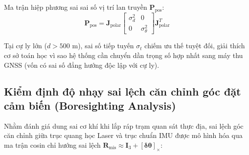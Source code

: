 Ma trận hiệp phương sai sai số vị trí lan truyền $\mathbf{P}_{\text{pos}}$:
\begin{equation}
\mathbf{P}_{\text{pos}} = \mathbf{J}_{\text{polar}} \begin{bmatrix} \sigma_d^2 & 0 \\ 0 & \sigma_\theta^2 \end{bmatrix} \mathbf{J}_{\text{polar}}^T
\label{eq:polar-covariance-propagation}
\end{equation}

\begin{table}[H]
\centering
\caption{Kích thước bán trục lớn elip sai số $3\sigma$ theo cự ly quan sát ($\sigma_d = 0{,}1$ m, $\sigma_\theta = 0{,}1^\circ$)}
\label{tab:range-error-ellipse-table}
\end{table}

Tại cự ly lớn ($d > 500$ m), sai số tiếp tuyến $\sigma_t$ chiếm ưu thế tuyệt đối, giải thích cơ sở toán học vì sao hệ thống cần chuyển dần trọng số hợp nhất sang máy thu GNSS (vốn có sai số đẳng hướng độc lập với cự ly).

\subsection{Kiểm định độ nhạy sai lệch căn chỉnh góc đặt cảm biến (Boresighting Analysis)}

\hspace{0.5cm} Nhằm đánh giá dung sai cơ khí khi lắp ráp trạm quan sát thực địa, sai lệch góc căn chỉnh giữa trục quang học Laser và trục chuẩn IMU được mô hình hóa qua ma trận cosin chỉ hướng sai lệch $\mathbf{R}_{\text{mis}} \approx \mathbf{I}_3 + [\boldsymbol{\delta\theta}]_\times$:

